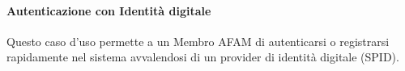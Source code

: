 
\paragraph{Autenticazione con Identit\`a digitale}
\par{\noindent Questo caso d'uso permette a un Membro AFAM di autenticarsi o registrarsi rapidamente nel sistema avvalendosi di un provider di identit\`a digitale (SPID).}

